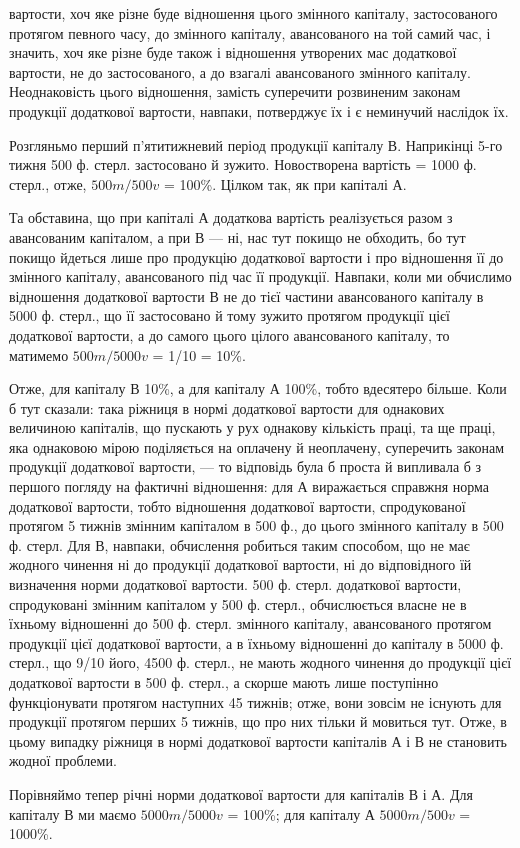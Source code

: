 \parcont{}  %
вартости, хоч яке різне буде відношення цього змінного капіталу, застосованого
протягом певного часу, до змінного капіталу, авансованого на
той самий час, і значить, хоч яке різне буде також і відношення утворених
мас додаткової вартости, не до застосованого, а до взагалі авансованого
змінного капіталу. Неоднаковість цього відношення, замість суперечити
розвиненим законам продукції додаткової вартости, навпаки,
потверджує їх і є неминучий наслідок їх.

Розгляньмо перший п’ятитижневий період продукції капіталу В. Наприкінці
5-го тижня 500 ф. стерл. застосовано й зужито. Новостворена
вартість = 1000 ф. стерл., отже, $500m/500v$ = 100\%. Цілком так, як при капіталі А.

Та обставина, що при капіталі А додаткова вартість реалізується разом з
авансованим капіталом, а при В — ні, нас тут покищо не обходить, бо
тут покищо йдеться лише про продукцію додаткової вартости і про
відношення її до змінного капіталу, авансованого під час її продукції.
Навпаки, коли ми обчислимо відношення додаткової вартости В не
до тієї частини авансованого капіталу в 5000 ф. стерл., що її застосовано й
тому зужито протягом продукції цієї додаткової вартости, а до самого
цього цілого авансованого капіталу, то матимемо $500m/5000v$ = 1/10 = 10\%.

Отже, для капіталу В 10\%, а для капіталу А 100\%, тобто вдесятеро
більше. Коли б тут сказали: така ріжниця в нормі додаткової вартости
для однакових величиною капіталів, що пускають у рух однакову кількість
праці, та ще праці, яка однаковою мірою поділяється на оплачену й
неоплачену, суперечить законам продукції додаткової вартости, — то
відповідь була б проста й випливала б з першого погляду на фактичні
відношення: для А виражається справжня норма додаткової вартости,
тобто відношення додаткової вартости, спродукованої протягом 5 тижнів
змінним капіталом в 500 ф., до цього змінного капіталу в 500 ф. стерл.
Для В, навпаки, обчислення робиться таким способом, що не має жодного
чинення ні до продукції додаткової вартости, ні до відповідного їй
визначення норми додаткової вартости. 500 ф. стерл. додаткової вартости,
спродуковані змінним капіталом у 500 ф. стерл., обчислюється
власне не в їхньому відношенні до 500 ф. стерл. змінного капіталу, авансованого
протягом продукції цієї додаткової вартости, а в їхньому відношенні
до капіталу в 5000 ф. стерл., що 9/10 його, 4500 ф. стерл., не мають
жодного чинення до продукції цієї додаткової вартости в 500 ф. стерл., а
скорше мають лише поступінно функціонувати протягом наступних 45 тижнів;
отже, вони зовсім не існують для продукції протягом перших 5 тижнів,
що про них тільки й мовиться тут. Отже, в цьому випадку ріжниця
в нормі додаткової вартости капіталів А і В не становить жодної
проблеми.

Порівняймо тепер річні норми додаткової вартости для капіталів В і А.
Для капіталу В ми маємо $5000m/5000v$ = 100\%; для капіталу А $5000m/500v$ = 1000\%.
\parbreak{}  %
